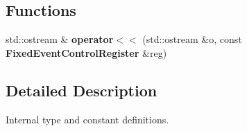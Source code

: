 \subsection*{Functions}
\begin{DoxyCompactItemize}
\item 
std\+::ostream \& {\bfseries operator$<$$<$} (std\+::ostream \&o, const {\bf Fixed\+Event\+Control\+Register} \&reg)\label{types_8h_ade23d63e7c0dd811d32fe7634735c043}

\end{DoxyCompactItemize}


\subsection{Detailed Description}
Internal type and constant definitions. 

